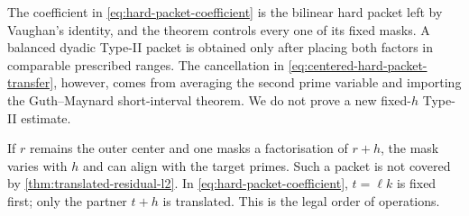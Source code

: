 \begin{remark}
The coefficient in \eqref{eq:hard-packet-coefficient} is the bilinear hard
packet left by Vaughan's identity, and the theorem controls every one of
its fixed masks.  A balanced dyadic Type-II packet is obtained only after
placing both factors in comparable prescribed ranges.  The cancellation in
\eqref{eq:centered-hard-packet-transfer}, however, comes from averaging the
second prime variable and importing the Guth--Maynard short-interval
theorem.  We do not prove a new fixed-$h$ Type-II estimate.
\end{remark}

\begin{remark}
If $r$ remains the outer center and one masks a factorisation of $r+h$, the
mask varies with $h$ and can align with the target primes.  Such a packet is
not covered by \cref{thm:translated-residual-l2}.  In
\eqref{eq:hard-packet-coefficient}, $t=\ell k$ is fixed first; only the
partner $t+h$ is translated.  This is the legal order of operations.
\end{remark}
